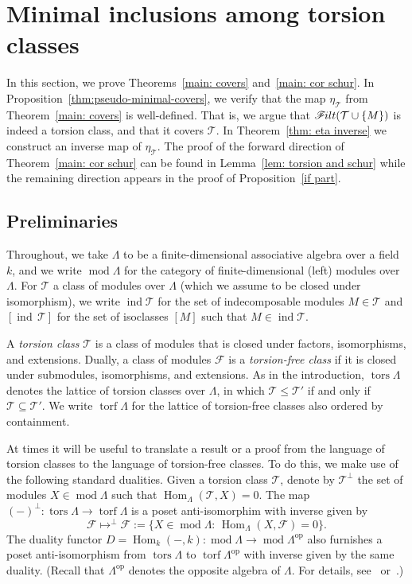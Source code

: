 \documentclass[ALCO,ThmDefs,Unicode,epreuves]{cedram}
\DeclareMathOperator{\tors}{tors}
\DeclareMathOperator{\torf}{torf}
\DeclareMathOperator{\op}{op}
\DeclareMathOperator{\Hom}{Hom}
\DeclareMathOperator{\ind}{ind}
\DeclareMathOperator{\module}{mod}
\newcommand{\calF}{\mathcal{F}}
\newcommand{\calT}{\mathcal{T}}
\newcommand{\filt}{\mathscr{F}\Mk ilt}
\renewcommand{\1}{\hat{1}}
\newcommand{\0}{\hat{0}}
\newcommand{\newword}[1]{\emph{#1}}
\newcommand*{\Mk}{\mkern -2mu}
\begin{document}

\section{Minimal inclusions among torsion classes}
\label{sec:minim-incl-among}
In this section, we prove Theorems~\ref{main: covers} and~\ref{main: cor schur}.
In Proposition~\ref{thm:pseudo-minimal-covers}, we verify that the map $\eta_{\calT}$ from Theorem~\ref{main: covers} is well-defined.
That is, we argue that $\filt(\calT \cup \{M\})$ is indeed a torsion class, and that it covers $\calT$.
In Theorem~\ref{thm: eta inverse} we construct an inverse map of $\eta_\calT$.
The proof of the forward direction of Theorem~\ref{main: cor schur}
can be found in Lemma~\ref{lem: torsion and schur} while the remaining direction appears in the proof of Proposition~\ref{if part}.


\subsection{Preliminaries}\label{sec: background torsion classes}
Throughout, we take $\Lambda$ to be a finite-dimensional associative
algebra over a field $k$, and we write $\module\Lambda$ for the category of finite-dimensional (left) modules over $\Lambda$.
For $\calT$ a class of modules over $\Lambda$ (which we assume to be closed
under isomorphism), we write $\ind \calT$ for the set of indecomposable modules $M\in \calT$ and $[\ind\, \calT]$ for the set of isoclasses $[M]$ such that $M\in \ind \calT$.

A \newword{torsion class} $\calT$ is a class of modules that is closed under factors, isomorphisms, and extensions.
Dually, a class of modules $\calF$ is a \newword{torsion-free class} if it is closed under submodules, isomorphisms, and extensions.
As in the introduction, $\tors \Lambda$ denotes the lattice of torsion classes over $\Lambda$, in which $\calT\le \calT'$ if and only if~$\calT\subseteq \calT'$.
We write $\torf \Lambda$ for the lattice of torsion-free classes also ordered by containment.

At times it will be useful to translate a result or a proof from the language of torsion classes to the language of torsion-free classes.
To do this, we make use of the following standard dualities.
Given a torsion class $\calT$, denote by $\calT^\perp$ the set of modules $X\in
\module \Lambda$ such that $\Hom_\Lambda(\calT, X) = 0$.
The map $(-)^\perp: \tors \Lambda \rightarrow \torf \Lambda$ is a poset
anti-isomorphim with inverse given by $$\calF \mapsto ^\perp
\calF:=\{X\in \module \Lambda:\, \Hom_\Lambda(X, \calF)=0\}.$$
The duality functor $D=\Hom_k(-,k): \module \Lambda \rightarrow \module \Lambda^{\op}$ also furnishes a poset anti-isomorphism from $\tors
\Lambda$ to $\torf \Lambda^{\op}$ with inverse given by the same duality.
(Recall that $\Lambda^{\op}$ denotes the opposite algebra of
$\Lambda$. For details, see~\cite{IRTT} or~\cite{S}.)
\end{document}
